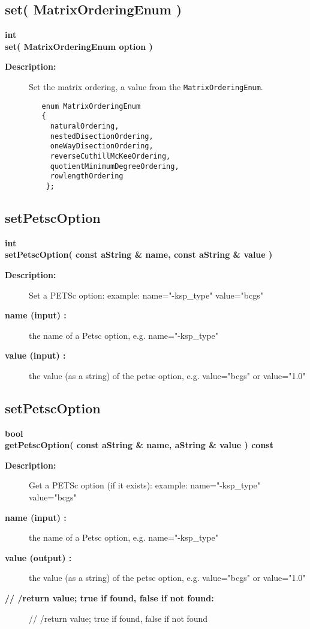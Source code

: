 \subsection{set( MatrixOrderingEnum )}
 
\begin{flushleft} \textbf{%
int  \\ 
\settowidth{\OgesParametersIncludeArgIndent}{set(}%
set( MatrixOrderingEnum option )
}\end{flushleft}
\begin{description}
\item[{\bf Description:}] 
   Set the matrix ordering, a value from the {\tt MatrixOrderingEnum}.
 \begin{verbatim}
   enum MatrixOrderingEnum
   {
     naturalOrdering,
     nestedDisectionOrdering,
     oneWayDisectionOrdering,
     reverseCuthillMcKeeOrdering,
     quotientMinimumDegreeOrdering,
     rowlengthOrdering
    };
 \end{verbatim}
\end{description}
\subsection{setPetscOption}
 
\begin{flushleft} \textbf{%
int  \\ 
\settowidth{\OgesParametersIncludeArgIndent}{setPetscOption(}%
setPetscOption( const aString \& name, const aString \& value )
}\end{flushleft}
\begin{description}
\item[{\bf Description:}] 
   Set a PETSc option: example: name="-ksp\_type" value="bcgs"
\item[{\bf name (input) :}]  the name of a Petsc option, e.g. name="-ksp\_type"
\item[{\bf value (input) :}]  the value (as a string) of the petsc option, e.g. value="bcgs" or value="1.0" 
\end{description}
\subsection{setPetscOption}
 
\begin{flushleft} \textbf{%
bool  \\ 
\settowidth{\OgesParametersIncludeArgIndent}{getPetscOption(}%
getPetscOption( const aString \& name, aString \& value ) const
}\end{flushleft}
\begin{description}
\item[{\bf Description:}] 
   Get a PETSc option (if it exists): example: name="-ksp\_type" value="bcgs"
\item[{\bf name (input) :}]  the name of a Petsc option, e.g. name="-ksp\_type"
\item[{\bf value (output) :}] the value (as a string) of the petsc option, e.g. value="bcgs" or value="1.0" 
\item[{\bf // /return value; true if found, false if not found:}] // /return value; true if found, false if not found
\end{description}
